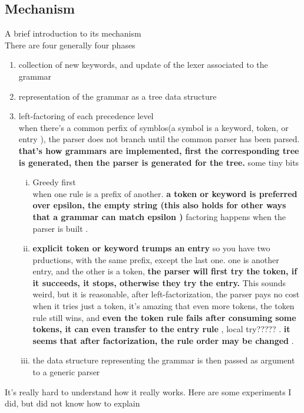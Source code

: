 \subsection{Mechanism}
A brief introduction to its mechanism \\
  There are four generally four phases
  \begin{enumerate}[1]
  \item collection of new keywords, and update of the lexer associated
    to the grammar
  \item representation of the grammar as a tree data structure
  \item left-factoring of each precedence level \\
    when there's a common perfix of symblos(a symbol is a keyword,
    token, or entry ), the parser does not branch until the common parser
    has been parsed. \textbf{that's how grammars are implemented, first the
      corresponding tree is generated, then the parser is generated for
      the tree.}
    some tiny bits 
    \begin{enumerate}[(i)]
    \item Greedy first \\
      when one rule is a prefix of another. 
      \textbf{a token or keyword is preferred over
    epsilon, the empty string (this also holds for other ways that a
    grammar can match epsilon )} factoring happens when the parser is
  built .
    \item \textbf{ explicit token or keyword trumps an entry} so you
      have two prductions, with the same prefix, except the last
      one. one is another entry, and the other is a token, \textbf{the
        parser will first try the token, if it succeeds, it stops,
        otherwise they try the entry.} This sounds weird, but it is
      reasonable, after left-factorization, the parser pays no cost
      when it tries just a token, it's amazing that even more tokens,
      the token rule still wins, and \textbf{even the token rule fails
        after consuming some tokens, it can even transfer to the entry
        rule }, local try????? .  \textbf{it seems that after
        factorization, the rule order may be changed }. \\
  \item the data structure representing the grammar is then passed as
    argument to a generic parser
    \end{enumerate}
  \end{enumerate}


It's really hard to understand how it really works. Here are some
experiments I did, but did not know how to explain


